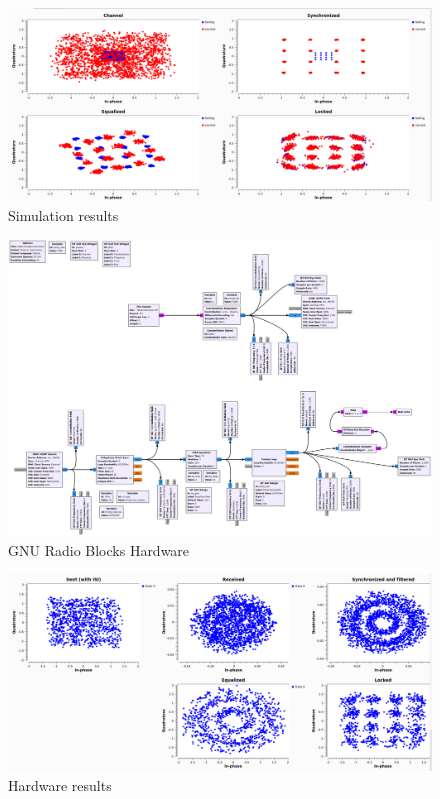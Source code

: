 \begin{figure}
	\includegraphics[width=\linewidth]{./figures/screenshots/QAM16_Fading_2_.png}
	\caption{Simulation results}
	\label{fig:simul16QAM_1}	
\end{figure}

\begin{figure}
	\includegraphics[width=\linewidth]{./figures/pdfs/qam_Hardware_1711.pdf}
	\caption{GNU Radio Blocks Hardware}
	\label{fig:simul16QAM_Hardware_Aufbau}	
\end{figure}

\begin{figure}
	\includegraphics[width=\linewidth]{./figures/screenshots/QAM16_Hardware_1711.png}
	\caption{Hardware results}
	\label{fig:simul16QAM__Hardware}	
\end{figure}


